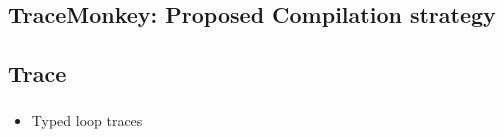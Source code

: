 \documentclass[mathserif,10pt]{beamer}
\newcommand{\cmt}[1]{}
\begin{document}
\subsection{TraceMonkey: Proposed Compilation strategy}
\frame
{
  \frametitle{\subsecname}
  \begin{itemize}
  \end{itemize}
}
    \cmt{
    \begin{itemize}
      \item Identify frequently executed loops ``hot loops'' on the fly.
      \item Generate type specialized machine code for each path through the loop.
    \end{itemize}
    }
\subsection{Trace}
\frame
{
  \frametitle{\subsecname}
  \begin{itemize}
    \item Typed loop traces
    \begin{itemize}
    \end{itemize}
  \end{itemize}
}
        \cmt {What happens with type unstable loops?? Optimized code; keep entry type map}
\end{document}
